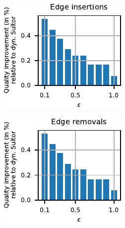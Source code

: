\begin{figure}[t]
\centering
\begin{subfigure}[b]{.5\textwidth}
\begin{subfigure}[b]{.5\textwidth}
\centering
\includegraphics[width=.9\textwidth]{sources/plots/dyn-mwm/rw-insertion-road-qual.pdf}
\end{subfigure}\hfill
\begin{subfigure}[b]{.5\textwidth}
\centering
\includegraphics[width=.9\textwidth]{sources/plots/dyn-mwm/rw-removal-road-qual.pdf}
\end{subfigure}

\end{subfigure}
\end{figure}
